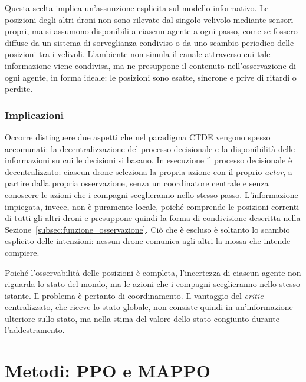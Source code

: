 \documentclass[12pt,a4paper,twoside]{report}
\newcommand{\paginabianca}{\clearpage\null\thispagestyle{empty}\clearpage}
\begin{document}
Questa scelta implica un'assunzione esplicita sul modello informativo. Le posizioni degli altri droni non sono rilevate dal singolo velivolo mediante sensori propri, ma si assumono disponibili a ciascun agente a ogni passo, come se fossero diffuse da un sistema di sorveglianza condiviso o da uno scambio periodico delle posizioni tra i velivoli. L'ambiente non simula il canale attraverso cui tale informazione viene condivisa, ma ne presuppone il contenuto nell'osservazione di ogni agente, in forma ideale: le posizioni sono esatte, sincrone e prive di ritardi o perdite.

\subsection{Implicazioni}
Occorre distinguere due aspetti che nel paradigma CTDE vengono spesso accomunati: la decentralizzazione del processo decisionale e la disponibilità delle informazioni su cui le decisioni si basano. In esecuzione il processo decisionale è decentralizzato: ciascun drone seleziona la propria azione con il proprio \emph{actor}, a partire dalla propria osservazione, senza un coordinatore centrale e senza conoscere le azioni che i compagni sceglieranno nello stesso passo. L'informazione impiegata, invece, non è puramente locale, poiché comprende le posizioni correnti di tutti gli altri droni e presuppone quindi la forma di condivisione descritta nella Sezione~\ref{subsec:funzione_osservazione}. Ciò che è escluso è soltanto lo scambio esplicito delle intenzioni: nessun drone comunica agli altri la mossa che intende compiere.

Poiché l'osservabilità delle posizioni è completa, l'incertezza di ciascun agente non riguarda lo stato del mondo, ma le azioni che i compagni sceglieranno nello stesso istante. Il problema è pertanto di coordinamento. Il vantaggio del \emph{critic} centralizzato, che riceve lo stato globale, non consiste quindi in un'informazione ulteriore sullo stato, ma nella stima del valore dello stato congiunto durante l'addestramento.

\paginabianca
\chapter{Metodi: PPO e MAPPO}
\label{chap:metodi}
\end{document}
